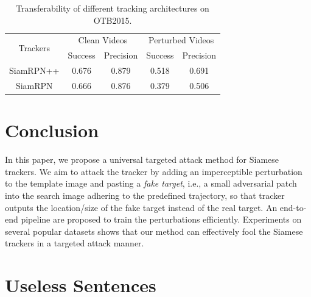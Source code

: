 \documentclass{article}
\begin{document}

\begin{table}[htpb]
\centering
\scriptsize
\tabcolsep=2.0pt
\begin{tabular}{c|cc|cc} 
\toprule
\multirow{2}{*}[-2pt]{Trackers} & \multicolumn{2}{c|}{Clean Videos} & \multicolumn{2}{c}{Perturbed Videos}  \\
\cmidrule{2-5}
                          & Success & Precision              & Success & Precision                   \\
\midrule
SiamRPN++                 & 0.676   & 0.879                  & 0.518   & 0.691                       \\
SiamRPN                   & 0.666   & 0.876                  & 0.379   & 0.506                       \\
\bottomrule
\end{tabular}
\caption{Transferability of different tracking architectures on OTB2015.}
\label{tab:arch}
\end{table}

\section{Conclusion}

In this paper, we propose a universal targeted attack method for Siamese trackers. 
We aim to attack the tracker by adding an imperceptible perturbation to the template image and pasting a \textit{fake target}, i.e., a small adversarial patch into the search image adhering to the predefined trajectory, so that tracker outputs the location/size of the fake target instead of the real target. An end-to-end pipeline are proposed to train the perturbations efficiently.
Experiments on several popular datasets shows that our method can effectively fool the Siamese trackers in a targeted attack manner.

\clearpage



\iffalse
\section{Useless Sentences}
\end{document}

